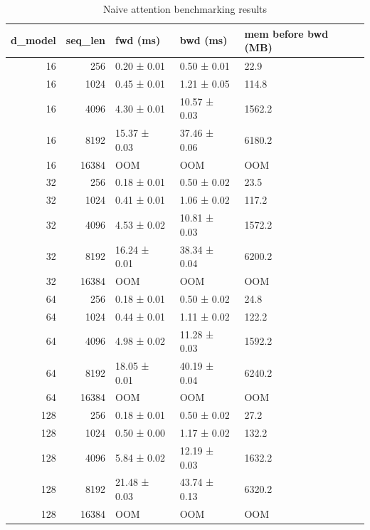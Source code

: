 \begin{table}
\caption{Naive attention benchmarking results}
\label{tab:attention_bench}
\begin{tabular}{rrlll}
\toprule
d_model & seq_len & fwd (ms) & bwd (ms) & mem before bwd (MB) \\
\midrule
16 & 256 & 0.20 ± 0.01 & 0.50 ± 0.01 & 22.9 \\
16 & 1024 & 0.45 ± 0.01 & 1.21 ± 0.05 & 114.8 \\
16 & 4096 & 4.30 ± 0.01 & 10.57 ± 0.03 & 1562.2 \\
16 & 8192 & 15.37 ± 0.03 & 37.46 ± 0.06 & 6180.2 \\
16 & 16384 & OOM & OOM & OOM \\
32 & 256 & 0.18 ± 0.01 & 0.50 ± 0.02 & 23.5 \\
32 & 1024 & 0.41 ± 0.01 & 1.06 ± 0.02 & 117.2 \\
32 & 4096 & 4.53 ± 0.02 & 10.81 ± 0.03 & 1572.2 \\
32 & 8192 & 16.24 ± 0.01 & 38.34 ± 0.04 & 6200.2 \\
32 & 16384 & OOM & OOM & OOM \\
64 & 256 & 0.18 ± 0.01 & 0.50 ± 0.02 & 24.8 \\
64 & 1024 & 0.44 ± 0.01 & 1.11 ± 0.02 & 122.2 \\
64 & 4096 & 4.98 ± 0.02 & 11.28 ± 0.03 & 1592.2 \\
64 & 8192 & 18.05 ± 0.01 & 40.19 ± 0.04 & 6240.2 \\
64 & 16384 & OOM & OOM & OOM \\
128 & 256 & 0.18 ± 0.01 & 0.50 ± 0.02 & 27.2 \\
128 & 1024 & 0.50 ± 0.00 & 1.17 ± 0.02 & 132.2 \\
128 & 4096 & 5.84 ± 0.02 & 12.19 ± 0.03 & 1632.2 \\
128 & 8192 & 21.48 ± 0.03 & 43.74 ± 0.13 & 6320.2 \\
128 & 16384 & OOM & OOM & OOM \\
\bottomrule
\end{tabular}
\end{table}
